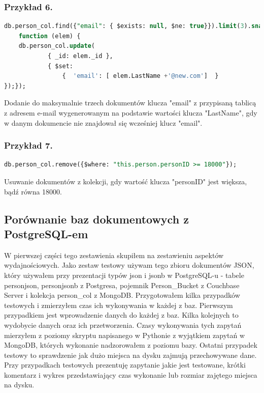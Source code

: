 \documentclass[a4paper,12pt,table]{article}
\begin{document}
{\subsubsection*{Przykład 6.}
\begin{lstlisting}[language=SQL,basicstyle=\footnotesize]
db.person_col.find({"email": { $exists: null, $ne: true}}).limit(3).snapshot().forEach(
    function (elem) {
	db.person_col.update(
            { _id: elem._id },
            { $set: 
            	{  'email': [ elem.LastName +'@new.com']  }
});});
\end{lstlisting}
\vspace{0.5cm}
Dodanie do maksymalnie trzech dokumentów klucza "email" z przypisaną tablicą z adresem e-mail wygenerowanym na podstawie wartości klucza "LastName", gdy w danym dokumencie nie znajdował się wcześniej klucz "email".
\subsubsection*{Przykład 7.}
\begin{lstlisting}[language=SQL,basicstyle=\footnotesize]
db.person_col.remove({$where: "this.person.personID >= 18000"});
\end{lstlisting}
\vspace{0.5cm}
Usuwanie dokumentów z kolekcji, gdy wartość klucza "personID" jest większa, bądź równa 18000.


\setlength{\parskip}{0.5\bigskipamount plus \smallskipamount minus \smallskipamount}
\newpage
\subsection{Porównanie baz dokumentowych z PostgreSQL-em}
W pierwszej części tego zestawienia skupiłem na zestawieniu aspektów wydajnościowych. Jako zestaw testowy używam tego zbioru dokumentów JSON, który używałem przy prezentacji typów json i jsonb w  PostgreSQL-u - tabele personjson, personjsonb z Postgresa, pojemnik Person\_Bucket z Couchbase Server i kolekcja person\_col z MongoDB. Przygotowałem kilka przypadków testowych i zmierzyłem czas ich wykonywania w każdej z baz. Pierwszym przypadkiem jest wprowadzenie danych do każdej z baz. Kilka kolejnych to wydobycie danych oraz ich przetworzenia. Czasy wykonywania tych zapytań mierzyłem z poziomy skryptu napisanego w Pythonie z wyjątkiem zapytań w MongoDB, których wykonanie nadzorowałem z poziomu bazy. Ostatni przypadek testowy to sprawdzenie jak dużo miejsca na dysku zajmują przechowywane dane. Przy przypadkach testowych prezentuję zapytanie jakie jest testowane, krótki komentarz i wykres przedstawiający czas wykonanie lub rozmiar zajętego miejsca na dysku.
}
\end{document}
